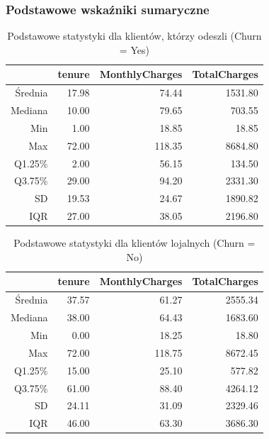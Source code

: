 \documentclass[12pt, a4paper]{article}\usepackage[]{graphicx}\usepackage[]{xcolor}
\begin{document}
\subsubsection{Podstawowe wskaźniki sumaryczne}
\begin{table}[ht]
\centering
\caption{Podstawowe statystyki dla klientów, którzy odeszli (Churn = Yes)} 
\label{tab:stats_churn_yes}
\begin{tabular}{rrrr}
  \hline
 & tenure & MonthlyCharges & TotalCharges \\ 
  \hline
Średnia & 17.98 & 74.44 & 1531.80 \\ 
  Mediana & 10.00 & 79.65 & 703.55 \\ 
  Min & 1.00 & 18.85 & 18.85 \\ 
  Max & 72.00 & 118.35 & 8684.80 \\ 
  Q1.25\% & 2.00 & 56.15 & 134.50 \\ 
  Q3.75\% & 29.00 & 94.20 & 2331.30 \\ 
  SD & 19.53 & 24.67 & 1890.82 \\ 
  IQR & 27.00 & 38.05 & 2196.80 \\ 
   \hline
\end{tabular}
\end{table}
\begin{table}[ht]
\centering
\caption{Podstawowe statystyki dla klientów lojalnych (Churn = No)} 
\label{tab:stats_churn_no}
\begin{tabular}{rrrr}
  \hline
 & tenure & MonthlyCharges & TotalCharges \\ 
  \hline
Średnia & 37.57 & 61.27 & 2555.34 \\ 
  Mediana & 38.00 & 64.43 & 1683.60 \\ 
  Min & 0.00 & 18.25 & 18.80 \\ 
  Max & 72.00 & 118.75 & 8672.45 \\ 
  Q1.25\% & 15.00 & 25.10 & 577.82 \\ 
  Q3.75\% & 61.00 & 88.40 & 4264.12 \\ 
  SD & 24.11 & 31.09 & 2329.46 \\ 
  IQR & 46.00 & 63.30 & 3686.30 \\ 
   \hline
\end{tabular}
\end{table}


\newpage
\end{document}
